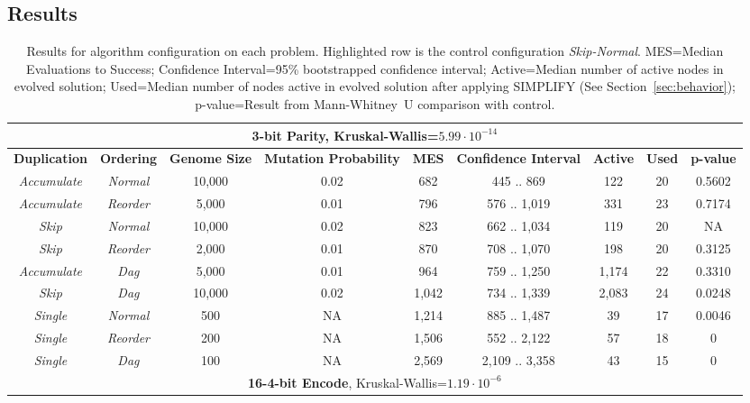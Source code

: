 \documentclass[journal]{IEEEtran}
\begin{document}
\subsection{Results}

\begin{table}
	\centering
	\caption{Results for algorithm configuration on each problem.  Highlighted row
	is the control configuration \emph{Skip-Normal}.  MES=Median Evaluations to Success;
	Confidence Interval=95\% bootstrapped confidence interval; Active=Median number of active nodes in evolved solution;
	Used=Median number of nodes active in evolved solution after applying SIMPLIFY (See Section~\ref{sec:behavior});
	p-value=Result from Mann-Whitney~U comparison with control.
	}
	\begin{tabular}{|c|c|c|c|c|c|c|c|c|}
	  \hline
	  \multicolumn{9}{|c|}{\textbf{3-bit Parity}, Kruskal-Wallis=$5.99\cdot 10^{-14}$} \\ \hline
\textbf{Duplication} & \textbf{Ordering} & \textbf{Genome Size} & \textbf{Mutation Probability} & \textbf{MES} & \textbf{Confidence Interval} & \textbf{Active} & \textbf{Used} & \textbf{p-value} \\ \hline
\emph{Accumulate} & \emph{Normal} & 10,000 & 0.02 & 682 & 445 .. 869 & 122 & 20 & 0.5602 \\ \hline
\emph{Accumulate} & \emph{Reorder}&  5,000 & 0.01 & 796 & 576 .. 1,019 & 331 & 23 & 0.7174 \\ \hline
\rowcolor{Gray}
\emph{Skip} & \emph{Normal}       & 10,000 & 0.02 & 823 & 662 .. 1,034 & 119 & 20 & NA \\ \hline
\emph{Skip} & \emph{Reorder}      &  2,000 & 0.01 & 870 & 708 .. 1,070 & 198 & 20 & 0.3125 \\ \hline
\emph{Accumulate} & \emph{Dag}    &  5,000 & 0.01 & 964 & 759 .. 1,250 & 1,174 & 22 & 0.3310 \\ \hline
\emph{Skip} & \emph{Dag}          & 10,000 & 0.02 & 1,042 & 734 .. 1,339 & 2,083 & 24 & 0.0248 \\ \hline
\emph{Single} & \emph{Normal}     & 500 & NA & 1,214 & 885 .. 1,487 & 39 & 17 & 0.0046 \\ \hline
\emph{Single} & \emph{Reorder}    & 200 & NA & 1,506 & 552 .. 2,122 & 57 & 18 & 0 \\ \hline
\emph{Single} & \emph{Dag}        & 100 & NA & 2,569 & 2,109 .. 3,358 & 43 & 15 & 0 \\ \hline\hline

	  \multicolumn{9}{|c|}{\textbf{16-4-bit Encode}, Kruskal-Wallis=$1.19\cdot 10^{-6}$} \\ \hline


\end{tabular}
\end{table}
\end{document}
